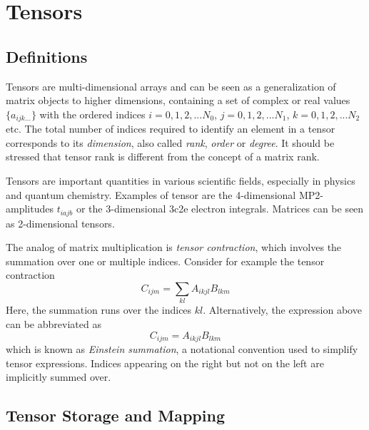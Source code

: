
\section{Tensors}

\subsection{Definitions}

Tensors are multi-dimensional arrays and can be seen as a generalization of matrix objects to higher dimensions, containing a set of complex or real values $\{a_{ijk...}\}$ with the ordered indices $i = 0,1,2,...N_0$, $j = 0,1,2,...N_1$, $k = 0,1,2,...N_2$ etc. The total number of indices required to identify an element in a tensor corresponds to its \emph{dimension}, also called \emph{rank}, \emph{order} or \emph{degree}. It should be stressed that tensor rank is different from the concept of a matrix rank. 

Tensors are important quantities in various scientific fields, especially in physics and quantum chemistry. Examples of tensor are the 4-dimensional MP2-amplitudes $t_{iajb}$ or the 3-dimensional 3c2e electron integrals. Matrices can be seen as 2-dimensional tensors. 

The analog of matrix multiplication is \emph{tensor contraction}, which involves the summation over one or multiple indices. Consider for example the tensor contraction
\begin{equation}
C_{ijm} = \sum_{kl} A_{ikjl} B_{lkm}
\end{equation}
\noindent Here, the summation runs over the indices $kl$. Alternatively, the expression above can be abbreviated as
\begin{equation}
C_{ijm} = A_{ikjl} B_{lkm}
\label{eq:TENEX}
\end{equation}
\noindent which is known as  \emph{Einstein summation}, a notational convention used to simplify tensor expressions. Indices appearing on the right but not on the left are implicitly summed over. 

\subsection{Tensor Storage and Mapping \label{sec:tenstor}}

